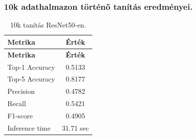 \subsubsection{10k adathalmazon történő tanítás eredményei.}
  \begin{center}
    \begin{longtable}{l c}
    \caption{10k tanítás ResNet50-en.} \label{tab:phase03_ResNet50_10k} \\
    \toprule
    \textbf{Metrika} & \textbf{Érték} \\
    \midrule
    \endfirsthead
    \toprule
    \textbf{Metrika} & \textbf{Érték} \\
    \midrule
    \endhead
    Top-1 Accuracy & 0.5133 \\
    Top-5 Accuracy & 0.8177 \\
    Precision      & 0.4782 \\
    Recall         & 0.5421 \\
    F1-score       & 0.4905 \\
    Inference time & 31.71 sec \\
    \bottomrule
    \end{longtable}
  \end{center}

